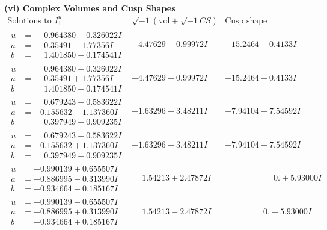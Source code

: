 \documentclass[1p]{elsarticle_modified}
\theoremstyle{definition}
\newcommand{\I}{\sqrt{-1}}
\begin{document}
\newpage\flushleft \textbf{(vi) Complex Volumes and Cusp Shapes}
$$\begin{array}{c|c|c}  
\text{Solutions to }I^u_{1}& \I (\text{vol} + \sqrt{-1}CS) & \text{Cusp shape}\\
 \hline 
\begin{aligned}
u &= \phantom{-}0.964380 + 0.326022 I \\
a &= \phantom{-}0.35491 - 1.77356 I \\
b &= \phantom{-}1.401850 + 0.174541 I\end{aligned}
 & -4.47629 - 0.99972 I & -15.2464 + 0.4133 I \\ \hline\begin{aligned}
u &= \phantom{-}0.964380 - 0.326022 I \\
a &= \phantom{-}0.35491 + 1.77356 I \\
b &= \phantom{-}1.401850 - 0.174541 I\end{aligned}
 & -4.47629 + 0.99972 I & -15.2464 - 0.4133 I \\ \hline\begin{aligned}
u &= \phantom{-}0.679243 + 0.583622 I \\
a &= -0.155632 - 1.137360 I \\
b &= \phantom{-}0.397949 + 0.909235 I\end{aligned}
 & -1.63296 - 3.48211 I & -7.94104 + 7.54592 I \\ \hline\begin{aligned}
u &= \phantom{-}0.679243 - 0.583622 I \\
a &= -0.155632 + 1.137360 I \\
b &= \phantom{-}0.397949 - 0.909235 I\end{aligned}
 & -1.63296 + 3.48211 I & -7.94104 - 7.54592 I \\ \hline\begin{aligned}
u &= -0.990139 + 0.655507 I \\
a &= -0.886995 - 0.313990 I \\
b &= -0.934664 - 0.185167 I\end{aligned}
 & \phantom{-}1.54213 + 2.47872 I & \phantom{-0.000000 -}0. + 5.93000 I \\ \hline\begin{aligned}
u &= -0.990139 - 0.655507 I \\
a &= -0.886995 + 0.313990 I \\
b &= -0.934664 + 0.185167 I\end{aligned}
 & \phantom{-}1.54213 - 2.47872 I & \phantom{-0.000000 } 0. - 5.93000 I \\ \hline\begin{aligned}

\end{aligned}
\end{array}$$
\end{document}
